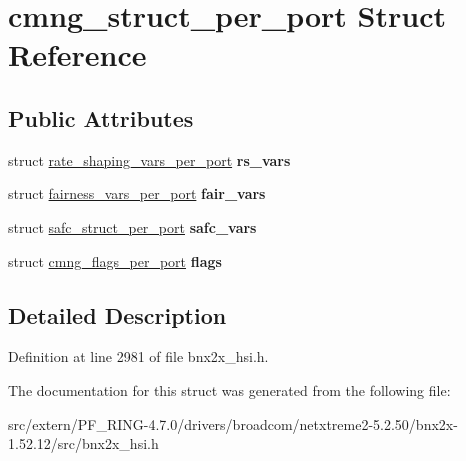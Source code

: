\hypertarget{structcmng__struct__per__port}{
\section{cmng\_\-struct\_\-per\_\-port Struct Reference}
\label{structcmng__struct__per__port}
}
\subsection*{Public Attributes}
\begin{DoxyCompactItemize}
\item 
\hypertarget{structcmng__struct__per__port_a4d37aae3985901cb9481c01f252396c1}{
struct \hyperlink{structrate__shaping__vars__per__port}{rate\_\-shaping\_\-vars\_\-per\_\-port} {\bfseries rs\_\-vars}}
\label{structcmng__struct__per__port_a4d37aae3985901cb9481c01f252396c1}

\item 
\hypertarget{structcmng__struct__per__port_ad0af2b17c66cc9ab134e4e844a47eee9}{
struct \hyperlink{structfairness__vars__per__port}{fairness\_\-vars\_\-per\_\-port} {\bfseries fair\_\-vars}}
\label{structcmng__struct__per__port_ad0af2b17c66cc9ab134e4e844a47eee9}

\item 
\hypertarget{structcmng__struct__per__port_ab6159e953ccd1ffbcea2625404074433}{
struct \hyperlink{structsafc__struct__per__port}{safc\_\-struct\_\-per\_\-port} {\bfseries safc\_\-vars}}
\label{structcmng__struct__per__port_ab6159e953ccd1ffbcea2625404074433}

\item 
\hypertarget{structcmng__struct__per__port_acf58bc1d8b78dc1eb6226473066c3e52}{
struct \hyperlink{structcmng__flags__per__port}{cmng\_\-flags\_\-per\_\-port} {\bfseries flags}}
\label{structcmng__struct__per__port_acf58bc1d8b78dc1eb6226473066c3e52}

\end{DoxyCompactItemize}


\subsection{Detailed Description}


Definition at line 2981 of file bnx2x\_\-hsi.h.



The documentation for this struct was generated from the following file:\begin{DoxyCompactItemize}
\item 
src/extern/PF\_\-RING-\/4.7.0/drivers/broadcom/netxtreme2-\/5.2.50/bnx2x-\/1.52.12/src/bnx2x\_\-hsi.h\end{DoxyCompactItemize}
